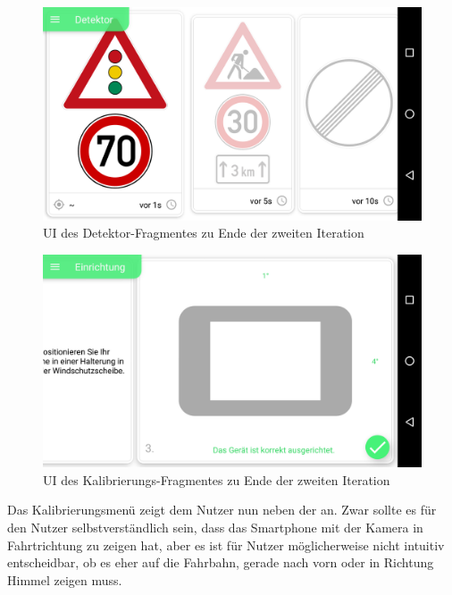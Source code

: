\documentclass[12pt,a4paper,ngerman,enabledeprecatedfontcommands]{scrreprt}
\begin{document}
\begin{figure}[H]
\centering
\includegraphics[width=0.9\linewidth]{Reviewdokument/Grafiken/app_detektor_neu.png}
\caption{UI des Detektor-Fragmentes zu Ende der zweiten Iteration}
\label{fig:detektor_ui_neu}
\end{figure}


\begin{figure}[H]
\centering
\includegraphics[width=0.9\linewidth]{Reviewdokument/Grafiken/app_setup_neu.png}
\caption{UI des Kalibrierungs-Fragmentes zu Ende der zweiten Iteration}
\label{fig:setup_ui}
\end{figure}

Das Kalibrierungsmenü zeigt dem \gls{Nutzer} nun neben der  an. Zwar sollte es für den \gls{Nutzer} selbstverständlich sein, dass das \gls{Smartphone} mit der Kamera in Fahrtrichtung zu zeigen hat, aber es ist für Nutzer möglicherweise nicht intuitiv entscheidbar, ob es eher auf die Fahrbahn, gerade nach vorn oder in Richtung Himmel zeigen muss.\\
\end{document}
